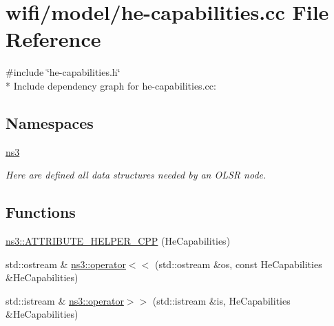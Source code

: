 \hypertarget{he-capabilities_8cc}{}\section{wifi/model/he-\/capabilities.cc File Reference}
\label{he-capabilities_8cc}
{\ttfamily \#include \char`\"{}he-\/capabilities.\+h\char`\"{}}\\*
Include dependency graph for he-\/capabilities.cc\+:
\subsection*{Namespaces}
\begin{DoxyCompactItemize}
\item 
 \hyperlink{namespacens3}{ns3}
\begin{DoxyCompactList}\small\item\em Here are defined all data structures needed by an O\+L\+SR node. \end{DoxyCompactList}\end{DoxyCompactItemize}
\subsection*{Functions}
\begin{DoxyCompactItemize}
\item 
\hyperlink{namespacens3_abd31465710a1d224f79608e76d325ebc}{ns3\+::\+A\+T\+T\+R\+I\+B\+U\+T\+E\+\_\+\+H\+E\+L\+P\+E\+R\+\_\+\+C\+PP} (He\+Capabilities)
\item 
std\+::ostream \& \hyperlink{namespacens3_a6bf3ebf8dcf3cefdac6aa91bd059268e}{ns3\+::operator$<$$<$} (std\+::ostream \&os, const He\+Capabilities \&He\+Capabilities)
\item 
std\+::istream \& \hyperlink{namespacens3_ac6b561361ff558b7034e35cb9fdf0a4a}{ns3\+::operator$>$$>$} (std\+::istream \&is, He\+Capabilities \&He\+Capabilities)
\end{DoxyCompactItemize}
